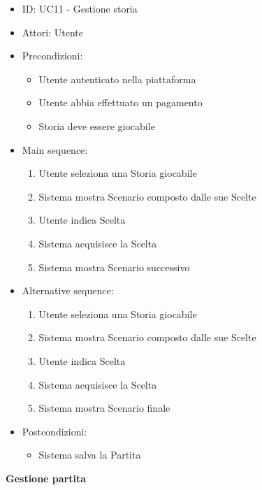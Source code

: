 \documentclass{article}
\begin{document}
\begin{itemize}[label = { }]
    \itemsep0px
    \item ID: UC11 - Gestione storia
    \item Attori: Utente
    \item Precondizioni: 
        \begin{itemize}[label = {-}]
            \item Utente autenticato nella piattaforma
            \item Utente abbia effettuato un pagamento
            \item Storia deve essere giocabile
        \end{itemize}
    \item Main sequence: 
        \begin{enumerate}
            \item Utente seleziona una Storia giocabile
            \item Sistema mostra Scenario composto dalle sue Scelte
            \item Utente indica Scelta
            \item Sistema acquisisce la Scelta
            \item Sistema mostra Scenario successivo
        \end{enumerate}
    \item Alternative sequence:
        \begin{enumerate}
            \item Utente seleziona una Storia giocabile
            \item Sistema mostra Scenario composto dalle sue Scelte
            \item Utente indica Scelta
            \item Sistema acquisisce la Scelta
            \item Sistema mostra Scenario finale
        \end{enumerate}
    \item Postcondizioni: 
        \begin{itemize}[label = {-}]
            \item Sistema salva la Partita
        \end{itemize}
\end{itemize}
\textbf{Gestione partita}
\end{document}
